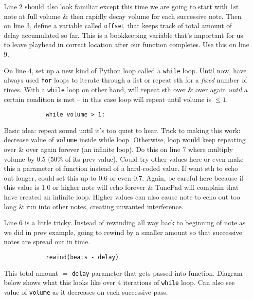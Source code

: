 \documentclass{article}
\begin{document}
\begin{itemize}
\begin{itemize}
		Line 2 should also look familiar except this time we are going to start with 1st note at full volume \& then rapidly decay volume for each successive note. Then on line 3, define a variable called {\tt offset} that keeps track of total amount of delay accumulated so far. This is a bookkeeping variable that's important for us to leave playhead in correct location after our function completes. Use this on line 9.
		
		On line 4, set up a new kind of Python loop called a {\tt while} loop. Until now, have always used {\tt for} loops to iterate through a list or repeat sth for a {\it fixed} number of times. With a {\tt while} loop on other hand, will repeat sth over \& over again {\it until} a certain condition is met -- in this case loop will repeat until volume is $\le1$.
		\begin{verbatim}
			while volume > 1:
		\end{verbatim}
		Basic idea: repeat sound until it's too quiet to hear. Trick to making this work: decrease value of {\tt volume} inside while loop. Otherwise, loop would keep repeating over \& over again forever (an infinite loop). Do this on line 7 where multiply volume by 0.5 (50\% of its prev value). Could try other values here or even make this a parameter of function instead of a hard-coded value. If want sth to echo out longer, could set this up to 0.6 or even 0.7. Again, be careful here because if this value is 1.0 or higher note will echo forever \& TunePad will complain that have created an infinite loop. Higher values can also cause note to echo out too long \& run into other notes, creating unwanted interference.
		
		Line 6 is a little tricky. Instead of rewinding all way back to beginning of note as we did in prev example, going to rewind by a smaller amount so that successive notes are spread out in time.
		\begin{verbatim}
			rewind(beats - delay)
		\end{verbatim}
		This total amount $=$ {\tt delay} parameter that gets passed into function. Diagram below shows what this looks like over 4 iterations of {\tt while} loop. Can also see value of {\tt volume} as it decreases on each successive pass.
		

\end{itemize}
\end{itemize}
\end{document}
